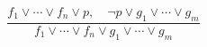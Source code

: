 \documentclass[preview,border=4pt]{standalone}
\begin{document}
\[
\frac{f_1 \lor \cdots \lor f_n \lor p,\quad
      \neg p \lor g_1 \lor \cdots \lor g_m}
    {f_1 \lor \cdots \lor f_n \lor g_1 \lor \cdots \lor g_m}
\]
\end{document}
